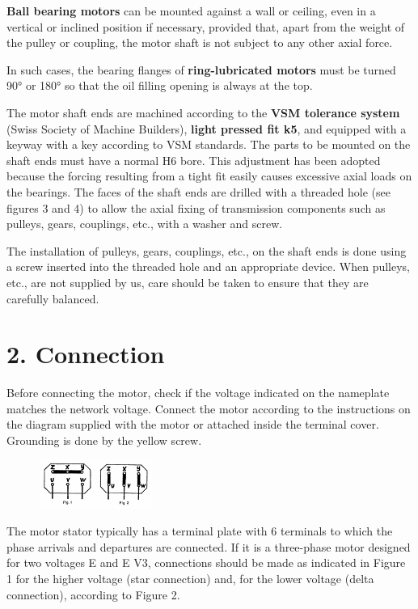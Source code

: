 {\textbf{Ball bearing motors} can be mounted against a wall or ceiling, even in a vertical or inclined position if necessary,
    provided that, apart from the weight of the pulley or coupling, the motor shaft is not subject to any other axial force.

In such cases, the bearing flanges of \textbf{ring-lubricated motors} must be turned 90° or 180° so that the oil filling opening is always at the top.

The motor shaft ends are machined according to the \textbf{VSM tolerance system} (Swiss Society of Machine Builders),
    \textbf{light pressed fit k5}, and equipped with a keyway with a key according to VSM standards.
The parts to be mounted on the shaft ends must have a normal H6 bore.
This adjustment has been adopted because the forcing resulting from a tight fit easily causes excessive axial loads on the bearings.
The faces of the shaft ends are drilled with a threaded hole (see figures 3 and 4) to allow the axial fixing
of transmission components such as pulleys, gears, couplings, etc., with a washer and screw.

The installation of pulleys, gears, couplings, etc., on the shaft ends is done using a screw inserted into the threaded
hole and an appropriate device. When pulleys, etc., are not supplied by us, care should be taken to ensure that they are carefully balanced.

\section*{2. Connection}

Before connecting the motor, check if the voltage indicated on the nameplate matches the network voltage.
Connect the motor according to the instructions on the diagram supplied with the motor or attached inside the terminal cover.
Grounding is done by the yellow screw.

    \begin{figure}
        \centering
        \includegraphics[width=0.33\textwidth]{images/page_62_alternating_motor_connections}
        \label{fig:alternating_motor_connections}
    \end{figure}

    The motor stator typically has a terminal plate with 6 terminals to which the phase arrivals and departures are connected.
    If it is a three-phase motor designed for two voltages E and E V3,
    connections should be made as indicated in Figure 1 for the higher voltage (star connection) and,
    for the lower voltage (delta connection), according to Figure 2.

}
